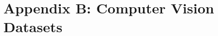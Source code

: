 \documentclass{tufte-handout}
\begin{document}
\section{Appendix B: Computer Vision Datasets}
\end{document}
